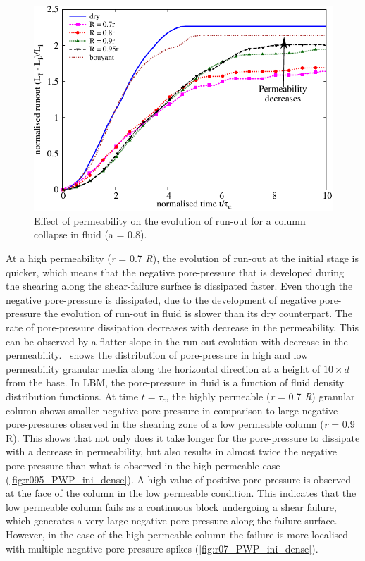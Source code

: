 \documentclass[12pt,a4paper,twocolumn,fleqn]{narms}
\begin{document}
\begin{figure}[htpb]
\centering
\includegraphics[width=0.9\linewidth]{figs/Runout_a08_dense}
\caption{Effect of permeability on the evolution of run-out for a column 
collapse in fluid (a = 0.8).}
\label{fig:Runout_a08_dense}
\end{figure}

At a high permeability (\textit{r} = 0.7 \textit{R}), the evolution of run-out 
at the initial stage is quicker, which means that the negative pore-pressure 
that is developed during the shearing along the shear-failure surface is 
dissipated faster. Even though the negative pore-pressure is dissipated, due to 
the development of negative pore-pressure the evolution of run-out in fluid is 
slower than its dry counterpart. The rate of pore-pressure dissipation 
decreases with decrease in the permeability. This can be observed by a flatter 
slope in the run-out evolution with decrease in the 
permeability.~ shows the distribution of pore-pressure 
in high and low permeability granular media along the horizontal direction at a 
height of $10 \times d$ from the base. In LBM, the pore-pressure in fluid is a 
function of fluid density distribution functions. At time $t = \tau_c$, the 
highly permeable (\textit{r} = 0.7 \textit{R}) granular column 
shows smaller negative pore-pressure in comparison to large negative 
pore-pressures observed in the shearing zone of a low permeable column 
(\textit{r} = 0.9 R). This shows that not only does it take longer for the 
pore-pressure to dissipate with a decrease in permeability, but also results in 
almost twice the negative pore-pressure than what is observed in the high 
permeable case (\cref{fig:r095_PWP_ini_dense}). A 
high value of positive pore-pressure is observed at the face of the column 
in the low permeable condition. This indicates that the low permeable column 
fails as a continuous block undergoing a shear failure, which generates a very 
large negative pore-pressure along the failure surface. However, in the case of 
the high permeable column the failure is more localised with multiple negative 
pore-pressure spikes (\cref{fig:r07_PWP_ini_dense}).
\end{document}
